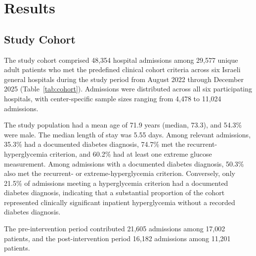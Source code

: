 \section{Results}

\subsection{Study Cohort}

The study cohort comprised 48,354 hospital admissions among 29,577 unique
adult patients who met the predefined clinical cohort criteria across six
Israeli general hospitals during the study period from August 2022 through
December 2025 (Table~\ref{tab:cohort}). Admissions were distributed across
all six participating hospitals, with center-specific sample sizes ranging
from 4,478 to 11,024 admissions.

The study population had a mean age of 71.9 years (median, 73.3), and
54.3\% were male. The median length of stay was 5.55 days. Among relevant
admissions, 35.3\% had a documented diabetes diagnosis, 74.7\% met the
recurrent-hyperglycemia criterion, and 60.2\% had at least one extreme
glucose measurement. Among admissions with a documented diabetes diagnosis,
50.3\% also met the recurrent- or extreme-hyperglycemia criterion.
Conversely, only 21.5\% of admissions meeting a hyperglycemia criterion
had a documented diabetes diagnosis, indicating that a substantial
proportion of the cohort represented clinically significant inpatient
hyperglycemia without a recorded diabetes diagnosis.

The pre-intervention period contributed 21,605 admissions among 17,002
patients, and the post-intervention period 16,182 admissions among 11,201
patients.

